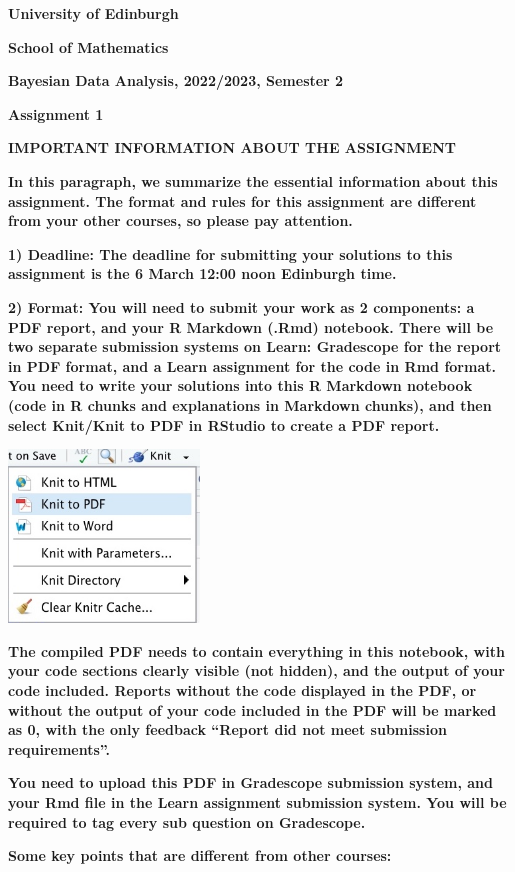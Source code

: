 \documentclass[
]{article}
\author{}
\date{\vspace{-2.5em}}
\begin{document}
\textbf{University of Edinburgh}

\textbf{School of Mathematics}

\textbf{Bayesian Data Analysis, 2022/2023, Semester 2}

\textbf{Assignment 1}

\textbf{IMPORTANT INFORMATION ABOUT THE ASSIGNMENT}

\textbf{In this paragraph, we summarize the essential information about
this assignment. The format and rules for this assignment are different
from your other courses, so please pay attention.}

\textbf{1) Deadline: The deadline for submitting your solutions to this
assignment is the 6 March 12:00 noon Edinburgh time.}

\textbf{2) Format: You will need to submit your work as 2 components: a
PDF report, and your R Markdown (.Rmd) notebook. There will be two
separate submission systems on Learn: Gradescope for the report in PDF
format, and a Learn assignment for the code in Rmd format. You need to
write your solutions into this R Markdown notebook (code in R chunks and
explanations in Markdown chunks), and then select Knit/Knit to PDF in
RStudio to create a PDF report.}

\includegraphics[width=2in,height=\textheight]{knit_to_PDF.jpg}

\textbf{The compiled PDF needs to contain everything in this notebook,
with your code sections clearly visible (not hidden), and the output of
your code included. Reports without the code displayed in the PDF, or
without the output of your code included in the PDF will be marked as 0,
with the only feedback ``Report did not meet submission requirements''.}

\textbf{You need to upload this PDF in Gradescope submission system, and
your Rmd file in the Learn assignment submission system. You will be
required to tag every sub question on Gradescope.}

\textbf{Some key points that are different from other courses:}
\end{document}
